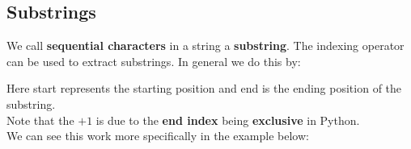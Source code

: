\documentclass[13pt,a4paper,oneside]{book}
\begin{document}
\subsection*{Substrings}%
\label{sub:Substrings}
We call \textbf{sequential characters} in a string a \textbf{substring}. The indexing operator can be used to extract substrings. In general we do this by:

Here start represents the starting position and end is the ending position of the substring.\\
Note that the $ +1 $ is due to the \textbf{end index} being \textbf{exclusive} in Python.\\
We can see this work more specifically in the example below:

\begin{tcolorbox}[title=Output,center title,hbox]
\end{tcolorbox}
\end{document}
